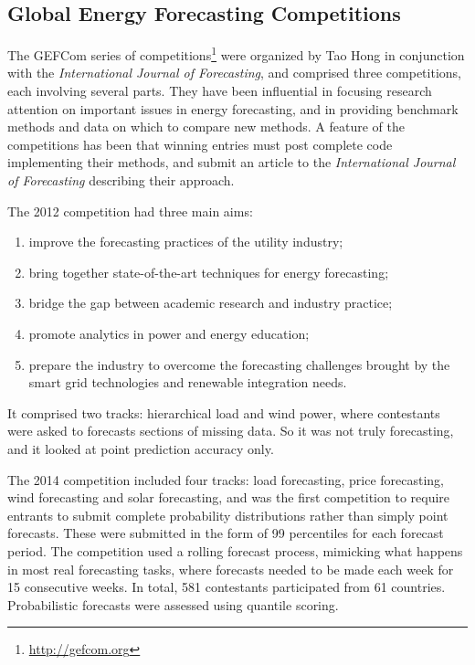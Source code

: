 \documentclass[11pt,a4paper,]{article}
\providecommand{\tightlist}{%
  \setlength{\itemsep}{0pt}\setlength{\parskip}{0pt}}
\begin{document}
\hypertarget{global-energy-forecasting-competitions}{%
\subsection*{Global Energy Forecasting Competitions}\label{global-energy-forecasting-competitions}}

The GEFCom series of competitions\footnote{\url{http://gefcom.org}} were organized by Tao Hong in conjunction with the \emph{International Journal of Forecasting}, and comprised three competitions, each involving several parts. They have been influential in focusing research attention on important issues in energy forecasting, and in providing benchmark methods and data on which to compare new methods. A feature of the competitions has been that winning entries must post complete code implementing their methods, and submit an article to the \emph{International Journal of Forecasting} describing their approach.

The 2012 competition \autocite{gefcom2012} had three main aims:

\begin{enumerate}
\def\labelenumi{\arabic{enumi}.}
\tightlist
\item
  improve the forecasting practices of the utility industry;
\item
  bring together state-of-the-art techniques for energy forecasting;
\item
  bridge the gap between academic research and industry practice;
\item
  promote analytics in power and energy education;
\item
  prepare the industry to overcome the forecasting challenges brought by the smart grid technologies and renewable integration needs.
\end{enumerate}

It comprised two tracks: hierarchical load and wind power, where contestants were asked to forecasts sections of missing data. So it was not truly forecasting, and it looked at point prediction accuracy only.

The 2014 competition \autocite{gefcom2014} included four tracks: load forecasting, price forecasting, wind forecasting and solar forecasting, and was the first competition to require entrants to submit complete probability distributions rather than simply point forecasts. These were submitted in the form of 99 percentiles for each forecast period. The competition used a rolling forecast process, mimicking what happens in most real forecasting tasks, where forecasts needed to be made each week for 15 consecutive weeks. In total, 581 contestants participated from 61 countries. Probabilistic forecasts were assessed using quantile scoring.
\end{document}
